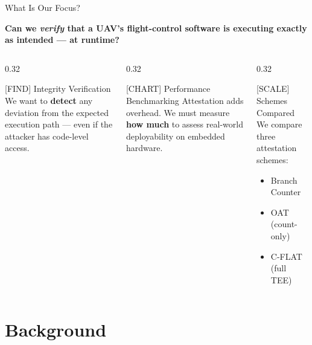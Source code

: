 \documentclass[aspectratio=169, 10pt]{beamer}
\begin{document}
\begin{frame}{What Is Our Focus?}
    \begin{center}
        \large\textbf{Can we \emph{verify} that a UAV's flight-control software
        is executing exactly as intended — at runtime?}
    \end{center}
    \vspace{8pt}
    \begin{columns}[T]
        \begin{column}{0.32\textwidth}
            \begin{greenbox}{[FIND] Integrity Verification}
                We want to \textbf{detect} any deviation from the expected
                execution path — even if the attacker has code-level access.
            \end{greenbox}
        \end{column}
        \begin{column}{0.32\textwidth}
            \begin{defbox}{[CHART] Performance Benchmarking}
                Attestation adds overhead. We must measure \textbf{how much}
                to assess real-world deployability on embedded hardware.
            \end{defbox}
        \end{column}
        \begin{column}{0.32\textwidth}
            \begin{warnbox}{[SCALE] Schemes Compared}
                We compare three attestation schemes:
                \begin{itemize}
                    \item Branch Counter
                    \item OAT (count-only)
                    \item C-FLAT (full TEE)
                \end{itemize}
            \end{warnbox}
        \end{column}
    \end{columns}
\end{frame}

\section{Background}
\end{document}
